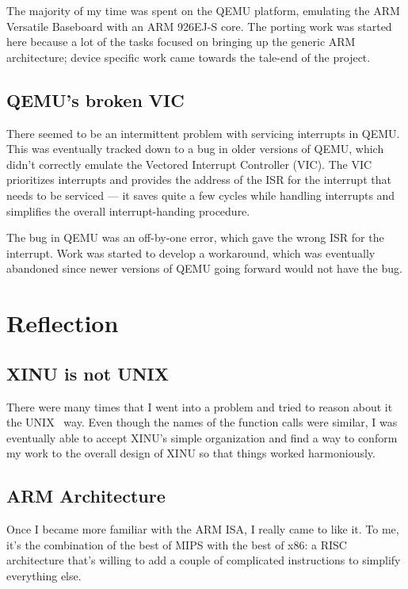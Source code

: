 \documentclass[12pt]{article}
\newcommand{\unix}[0]{U{\small NIX}}
\begin{document}
The majority of my time was spent on the QEMU platform, emulating the ARM
Versatile Baseboard with an ARM 926EJ-S core. The porting work was started here
because a lot of the tasks focused on bringing up the generic ARM architecture;
device specific work came towards the tale-end of the project.

\subsection{QEMU's broken VIC}

There seemed to be an intermittent problem with servicing interrupts in QEMU.
This was eventually tracked down to a bug in older versions of QEMU, which
didn't correctly emulate the Vectored Interrupt Controller (VIC). The VIC
prioritizes interrupts and provides the address of the ISR for the interrupt
that needs to be serviced \---- it saves quite a few cycles while handling
interrupts and simplifies the overall interrupt-handing procedure.

The bug in QEMU was an off-by-one error, which gave the wrong ISR for the
interrupt. Work was started to develop a workaround, which was eventually
abandoned since newer versions of QEMU going forward would not have the bug.

\section{Reflection}

\subsection{XINU is not \unix}

There were many times that I went into a problem and tried to reason about it
the \unix~ way. Even though the names of the function calls were similar, I was
eventually able to accept XINU's simple organization and find a way to conform
my work to the overall design of XINU so that things worked harmoniously.

\subsection{ARM Architecture}

Once I became more familiar with the ARM ISA, I really came to like it. To me,
it's the combination of the best of MIPS with the best of x86: a RISC
architecture that's willing to add a couple of complicated instructions to
simplify everything else.
\end{document}
